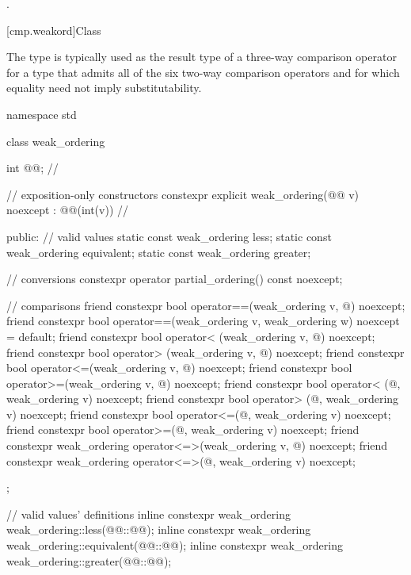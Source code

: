 \begin{itemdescr}
\pnum
\returns
{}.
\end{itemdescr}

[cmp.weakord]{Class }

\pnum
The  type is typically used
as the result type of a three-way comparison operator
for a type that admits
all of the six two-way comparison operators
and for which equality need not imply substitutability.

%
%
%
%
\begin{codeblock}
namespace std {
  class weak_ordering {
    int @@;  // \expos

    // exposition-only constructors
    constexpr explicit weak_ordering(@@ v) noexcept : @@(int(v)) {} // \expos

  public:
    // valid values
    static const weak_ordering less;
    static const weak_ordering equivalent;
    static const weak_ordering greater;

    // conversions
    constexpr operator partial_ordering() const noexcept;

    // comparisons
    friend constexpr bool operator==(weak_ordering v, @\unspec@) noexcept;
    friend constexpr bool operator==(weak_ordering v, weak_ordering w) noexcept = default;
    friend constexpr bool operator< (weak_ordering v, @\unspec@) noexcept;
    friend constexpr bool operator> (weak_ordering v, @\unspec@) noexcept;
    friend constexpr bool operator<=(weak_ordering v, @\unspec@) noexcept;
    friend constexpr bool operator>=(weak_ordering v, @\unspec@) noexcept;
    friend constexpr bool operator< (@\unspec@, weak_ordering v) noexcept;
    friend constexpr bool operator> (@\unspec@, weak_ordering v) noexcept;
    friend constexpr bool operator<=(@\unspec@, weak_ordering v) noexcept;
    friend constexpr bool operator>=(@\unspec@, weak_ordering v) noexcept;
    friend constexpr weak_ordering operator<=>(weak_ordering v, @\unspec@) noexcept;
    friend constexpr weak_ordering operator<=>(@\unspec@, weak_ordering v) noexcept;
  };

  // valid values' definitions
  inline constexpr weak_ordering weak_ordering::less(@@::@@);
  inline constexpr weak_ordering weak_ordering::equivalent(@@::@@);
  inline constexpr weak_ordering weak_ordering::greater(@@::@@);
}
\end{codeblock}

